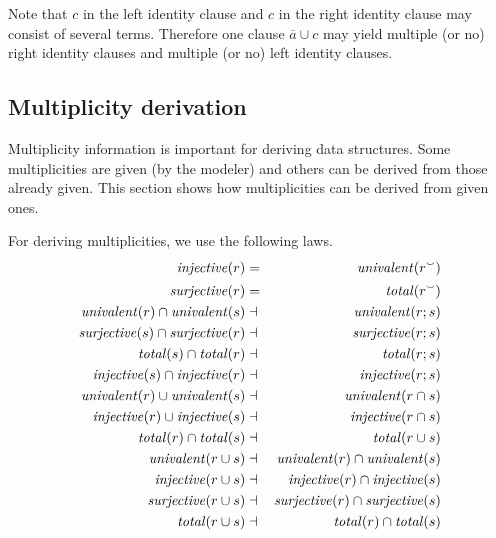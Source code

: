 \documentclass[11pt,a4paper,fleqn,oneside]{article}
\def\id#1{\text{\em #1\/}}
\newcommand{\univalent}[1]{\id{univalent}(#1)}
\newcommand{\total}[1]{\id{total}(#1)}
\newcommand{\surjective}[1]{\id{surjective}(#1)}
\newcommand{\injective}[1]{\id{injective}(#1)}
\newcommand{\flip}[1]{{#1}^\smallsmile}
\newcommand{\cmpl}[1]{\overline{#1}}
\newcommand{\compose}{;}
\newcommand{\subs}{\dashv}
\begin{document}
	Note that $c$ in the left identity clause and $c$ in the right identity clause may consist of several terms.
	Therefore one clause $\cmpl{a}\cup c$ may yield multiple (or no) right identity clauses and multiple (or no) left identity clauses.

\subsection{Multiplicity derivation}
	Multiplicity information is important for deriving data structures.
	Some multiplicities are given (by the modeler)
	and others can be derived from those already given.
	This section shows how multiplicities can be derived from given ones.

	For deriving multiplicities, we use the following laws.
\begin{eqnarray}
	\injective{r}&=&\univalent{\flip{r}}\label{eqn:flip univalent}\\
	\surjective{r}&=&\total{\flip{r}}\label{eqn:flip total}\\
	\univalent{r}\cap\univalent{s}&\subs&\univalent{r\compose s}\label{eqn:combi univalent}\\
	\surjective{s}\cap \surjective{r}&\subs&\surjective{r\compose s}\label{eqn:combi surjective}\\
	\total{s}\cap\total{r}&\subs&\total{r\compose s}\label{eqn:combi total}\\
	\injective{s}\cap\injective{r}&\subs&\injective{r\compose s}\label{eqn:combi injective}\\
	\univalent{r}\cup\univalent{s}&\subs&\univalent{r\cap s}\label{eqn:cap univalent}\\
	\injective{r}\cup\injective{s}&\subs&\injective{r\cap s}\label{eqn:cap injective}\\
	\total{r}\cap\total{s}&\subs&\total{r\cup s}\label{eqn:cup total}\\
	\univalent{r\cup s}&\subs&\univalent{r}\cap\univalent{s}\label{eqn:cup univalent}\\
	\injective{r\cup s}&\subs&\injective{r}\cap\injective{s}\\
	\surjective{r\cup s}&\subs&\surjective{r}\cap\surjective{s}\label{eqn:cup surjective}\\
	\total{r\cup s}&\subs&\total{r}\cap\total{s}
\end{eqnarray}
	
\end{document}
